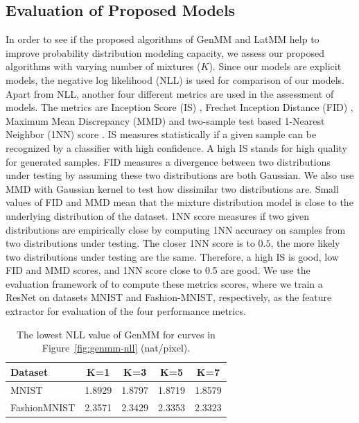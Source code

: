 \subsection{Evaluation of Proposed Models}\label{chpt6:sec:eval-metrics}
In order to see if the proposed algorithms of GenMM and LatMM help to improve probability distribution modeling capacity, we assess our proposed algorithms with varying number of mixtures ($K$). Since our models are explicit models, the negative log likelihood (NLL) is used for comparison of our models. Apart from NLL, another four different metrics are used in the assessment of models.
The metrics are Inception Score (IS) \cite{NIPS2016_6125,2018arXiv180101973B,2018arXiv180607755X}, Frechet
Inception Distance (FID) \cite{2017arXiv170608500H}, Maximum Mean
Discrepancy (MMD) \cite{2018arXiv180607755X} and two-sample test based 1-Nearest
Neighbor (1NN) score \cite{2016arXiv161006545L}. IS measures statistically if a given sample can be recognized by a classifier with high confidence. A high IS stands for high quality for generated samples. FID measures a divergence between two distributions under testing by assuming these two distributions are both Gaussian. We also use MMD with Gaussian kernel to test how dissimilar two distributions are.
Small values of FID and MMD mean that the mixture distribution model
is close to the underlying distribution of the dataset. 1NN score measures
if two given distributions are empirically close by computing 1NN accuracy
on samples from two distributions under testing. The closer 1NN score is to $0.5$, the more likely 
two distributions under testing are the same. Therefore, a high IS is good, low FID and MMD scores, and 1NN score close to 0.5 are good. We use the evaluation
framework of \cite{2018arXiv180607755X} to compute these metrics scores, where
we train a ResNet on datasets MNIST and Fashion-MNIST, respectively, as the feature extractor for evaluation of the four performance metrics.



\begin{table}
  \caption{The lowest NLL value of GenMM for curves in Figure~\ref{fig:genmm-nll} (nat/pixel).}
  \label{tab:lowestNLLgenMM}
   \centering
  \begin{tabular}{lcccc}
    \toprule
    {Dataset} & K=1 &  K=3 &  K=5 &  K=7 \\                                         
    \midrule                                                                                          MNIST &     1.8929 &    1.8797 &    1.8719 &    1.8579 \\
    FashionMNIST &   2.3571 &   2.3429 &   2.3353 &   2.3323 \\
    \bottomrule
  \end{tabular} 
\end{table}

